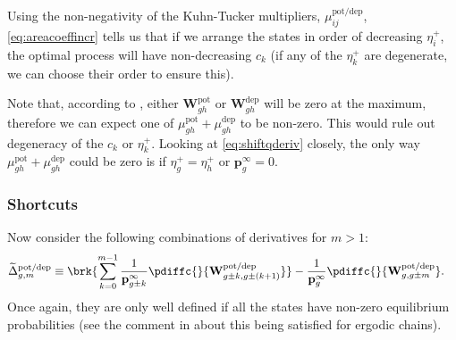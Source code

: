 \documentclass{article} %
\newcommand{\pr}{\mathbf{p}}
\newcommand{\eq}{\pr^\infty}
\newcommand{\W}{\mathbf{W}}
\newcommand{\pot}{^{\text{pot}}}
\newcommand{\dep}{^{\text{dep}}}
\newcommand{\potdep}{^{\text{pot/dep}}}
\begin{document}
Using the non-negativity of the Kuhn-Tucker multipliers, $\mu\potdep _{ij}$, \eqref{eq:areacoeffincr} tells us that if we arrange the states in order of decreasing $\eta^+_i$, the optimal process will have non-decreasing $c_k$ (if any of the $\eta^+_k$ are degenerate, we can choose their order to ensure this).

Note that, according to , either $\W\pot _{gh}$ or $\W\dep _{gh}$ will be zero at the maximum, therefore we can expect one of $\mu\pot _{gh}+\mu\dep _{gh}$ to be non-zero.
This would rule out degeneracy of the $c_k$ or $\eta^+_k$.
Looking at \eqref{eq:shiftqderiv} closely, the only way $\mu\pot _{gh}+\mu\dep _{gh}$ could be zero is if $\eta^+_g=\eta^+_h$ or $\eq_g=0$.

\subsubsection{Shortcuts}\label{sec:shortcuts}

Now consider the following combinations of derivatives for $m>1$:
%
\begin{align}
\label{eq:shortcutderiv}
    \widetilde{\Delta}\potdep _{g,m} &\equiv
      \brk{ \sum_{k=0}^{m-1} \frac{1}{\eq_{g\pm k}} \pdiffc{}{\W\potdep _{g\pm k,g\pm(k+1)}} }
      - \frac{1}{\eq_g} \pdiffc{}{\W\potdep _{g,g\pm m}}.
\end{align}
%
Once again, they are only well defined if all the states have non-zero equilibrium probabilities (see the comment in  about this being satisfied for ergodic chains).
\end{document}

